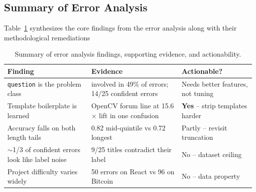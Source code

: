 \subsection{Summary of Error Analysis}
Table~\ref{tab:error_analysis_summary} synthesizes the core findings from the error analysis along with their methodological remediations
\begin{table}[h]
\centering
\caption{Summary of error analysis findings, supporting evidence, and actionability.}
\label{tab:error_analysis_summary}
\vspace{0.5em}
\begin{tabular}{p{4.5cm} p{6cm} p{3.5cm}}
\hline
Finding & Evidence & Actionable? \\
\hline
\texttt{question} is the problem class & involved in 49\% of errors; 14/25 confident errors & Needs better features, not tuning \\
Template boilerplate is learned & OpenCV forum line at 15.6$\times$ lift in one confusion & \textbf{Yes} -- strip templates harder \\
Accuracy falls on both length tails & 0.82 mid-quintile vs 0.72 longest & Partly -- revisit truncation \\
$\sim$1/3 of confident errors look like label noise & 9/25 titles contradict their label & No -- dataset ceiling \\
Project difficulty varies widely & 50 errors on React vs 96 on Bitcoin & No -- data property \\
\hline
\end{tabular}
\end{table}

